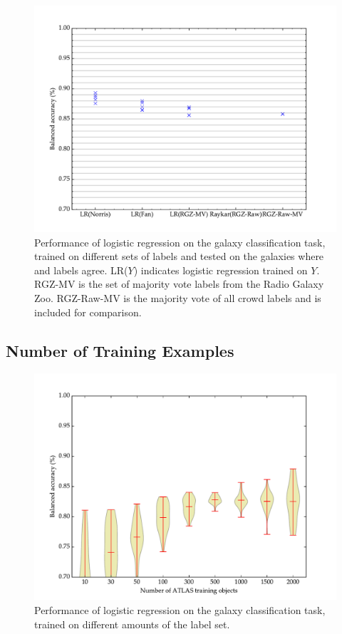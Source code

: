     \begin{figure}[!ht]
      \centering
      \includegraphics[width=\textwidth]{images/experiments/predictors.pdf}
      \caption{Performance of logistic regression on the galaxy classification
        task, trained on different sets of labels and tested on the galaxies
        where \citeauthor{norris06} and \citeauthor{fan15} labels agree. LR($Y$)
        indicates logistic regression trained on $Y$. RGZ-MV is the set of
        majority vote labels from the Radio Galaxy Zoo. RGZ-Raw-MV is the
        majority vote of all crowd labels and is included for comparison.}
    \end{figure}

  \subsection{Number of Training Examples}

    \begin{figure}[!ht]
      \centering
      \includegraphics[width=\textwidth]{images/experiments/passive.pdf}
      \caption{Performance of logistic regression on the galaxy classification
        task, trained on different amounts of the \citeauthor{norris06} label
        set.}
    \end{figure}

